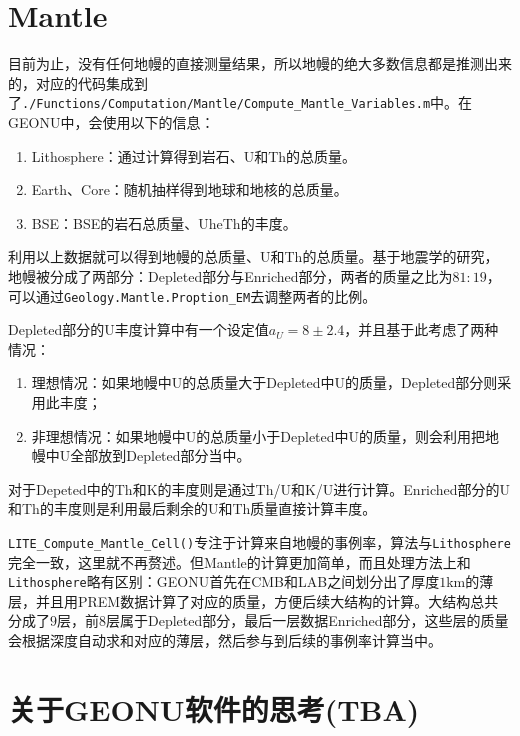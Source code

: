 		\section{Mantle}
			目前为止，没有任何地幔的直接测量结果，所以地幔的绝大多数信息都是推测出来的，对应的代码集成到了\texttt{./Functions/Computation/Mantle/Compute\_Mantle\_Variables.m}中。在GEONU中，会使用以下的信息：
				\begin{enumerate}
					\item Lithosphere：通过计算得到岩石、U和Th的总质量。
					\item Earth、Core：随机抽样得到地球和地核的总质量。
					\item BSE：BSE的岩石总质量、UheTh的丰度。
				\end{enumerate}
			利用以上数据就可以得到地幔的总质量、U和Th的总质量。基于地震学的研究，地幔被分成了两部分：Depleted部分与Enriched部分，两者的质量之比为$81:19$，可以通过\texttt{Geology.Mantle.Proption\_EM}去调整两者的比例。\par
			Depleted部分的U丰度计算中有一个设定值$a_U = 8\pm 2.4$，并且基于此考虑了两种情况：
				\begin{enumerate}
					\item 理想情况：如果地幔中U的总质量大于Depleted中U的质量，Depleted部分则采用此丰度；
					\item 非理想情况：如果地幔中U的总质量小于Depleted中U的质量，则会利用把地幔中U全部放到Depleted部分当中。
				\end{enumerate}
			对于Depeted中的Th和K的丰度则是通过Th/U和K/U进行计算。Enriched部分的U和Th的丰度则是利用最后剩余的U和Th质量直接计算丰度。\par
			\texttt{LITE\_Compute\_Mantle\_Cell()}专注于计算来自地幔的事例率，算法与\texttt{Lithosphere}完全一致，这里就不再赘述。但Mantle的计算更加简单，而且处理方法上和\texttt{Lithosphere}略有区别：GEONU首先在CMB和LAB之间划分出了厚度$1$km的薄层，并且用PREM数据计算了对应的质量，方便后续大结构的计算。大结构总共分成了$9$层，前$8$层属于Depleted部分，最后一层数据Enriched部分，这些层的质量会根据深度自动求和对应的薄层，然后参与到后续的事例率计算当中。
		\section{关于GEONU软件的思考(TBA)}
				
